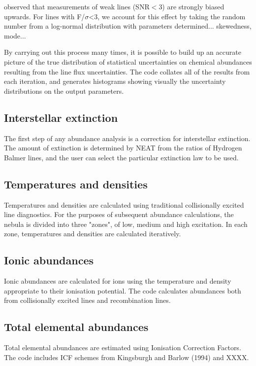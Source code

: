 \documentclass[useAMS,usenatbib]{mn2e}
\begin{document}
\citet{1994A&A...287..676R} observed that measurements of weak lines (SNR$<$3) are strongly biased upwards.  For lines with F/$\sigma$<3, we account for this effect by taking the random number from a log-normal distribution with parameters determined... skewedness, mode...

By carrying out this process many times, it is possible to build up an accurate picture of the true distribution of statistical uncertainties on chemical abundances resulting from the line flux uncertainties.  The code collates all of the results from each iteration, and generates histograms showing visually the uncertainty distributions on the output parameters.

\subsection{Interstellar extinction}

The first step of any abundance analysis is a correction for interstellar extinction.  The amount of extinction is determined by NEAT from the ratios of Hydrogen Balmer lines, and the user can select the particular extinction law to be used.

\subsection{Temperatures and densities}

Temperatures and densities are calculated using traditional collisionally excited line diagnostics.  For the purposes of subsequent abundance calculations, the nebula is divided into three "zones", of low, medium and high excitation.  In each zone, temperatures and densities are calculated iteratively.

\subsection{Ionic abundances}

Ionic abundances are calculated for ions using the temperature and density appropriate to their ionisation potential.  The code calculates abundances both from collisionally excited lines and recombination lines.

\subsection{Total elemental abundances}

Total elemental abundances are estimated using Ionisation Correction Factors.  The code includes ICF schemes from Kingsburgh and Barlow (1994) and XXXX.
\end{document}

